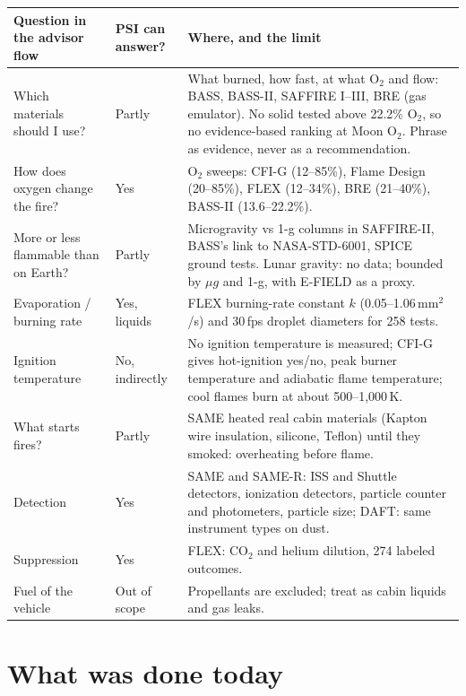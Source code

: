 \documentclass[10pt,a4paper]{article}
\begin{document}
\begin{tabularx}{\linewidth}{@{}p{4.1cm}p{2.1cm}L@{}}
\toprule
\textbf{Question in the advisor flow} & \textbf{PSI can answer?} & \textbf{Where, and the limit}\\
\midrule
Which materials should I use? & Partly & What burned, how fast, at what O$_2$ and flow: BASS, BASS-II, SAFFIRE I--III, BRE (gas emulator). No solid tested above 22.2\% O$_2$, so no evidence-based ranking at Moon O$_2$. Phrase as evidence, never as a recommendation.\\
How does oxygen change the fire? & Yes & O$_2$ sweeps: CFI-G (12--85\%), Flame Design (20--85\%), FLEX (12--34\%), BRE (21--40\%), BASS-II (13.6--22.2\%).\\
More or less flammable than on Earth? & Partly & Microgravity vs 1-g columns in SAFFIRE-II, BASS's link to NASA-STD-6001, SPICE ground tests. Lunar gravity: no data; bounded by $\mu g$ and 1-g, with E-FIELD as a proxy.\\
Evaporation / burning rate & Yes, liquids & FLEX burning-rate constant $k$ (0.05--1.06\,mm$^2$/s) and 30\,fps droplet diameters for 258 tests.\\
Ignition temperature & No, indirectly & No ignition temperature is measured; CFI-G gives hot-ignition yes/no, peak burner temperature and adiabatic flame temperature; cool flames burn at about 500--1,000\,K.\\
What starts fires? & Partly & SAME heated real cabin materials (Kapton wire insulation, silicone, Teflon) until they smoked: overheating before flame.\\
Detection & Yes & SAME and SAME-R: ISS and Shuttle detectors, ionization detectors, particle counter and photometers, particle size; DAFT: same instrument types on dust.\\
Suppression & Yes & FLEX: CO$_2$ and helium dilution, 274 labeled outcomes.\\
Fuel of the vehicle & Out of scope & Propellants are excluded; treat as cabin liquids and gas leaks.\\
\bottomrule
\end{tabularx}

\section{What was done today}
\end{document}
